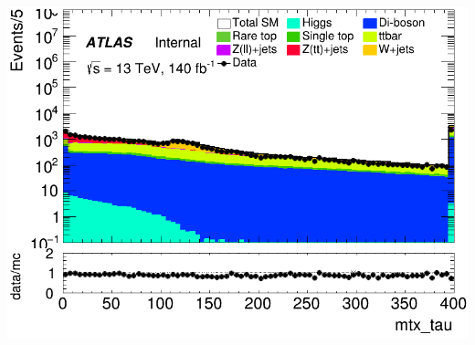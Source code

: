 \documentclass[usenames,dvipsnames]{beamer}
\begin{document}
\begin{frame}
\begin{minipage}{0.32\textwidth}
        \includegraphics[width=\textwidth]{graphics/L_met/L_met_mtx_tau.png}
    \end{minipage}
\end{frame}
\end{document}

